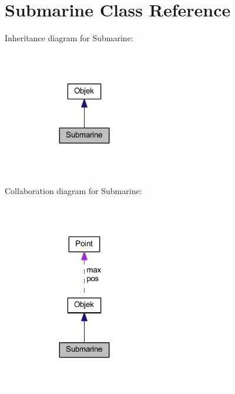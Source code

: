 \hypertarget{class_submarine}{}\section{Submarine Class Reference}
\label{class_submarine}


Inheritance diagram for Submarine\+:\nopagebreak
\begin{figure}[H]
\begin{center}
\leavevmode
\includegraphics[width=143pt]{class_submarine__inherit__graph}
\end{center}
\end{figure}


Collaboration diagram for Submarine\+:\nopagebreak
\begin{figure}[H]
\begin{center}
\leavevmode
\includegraphics[width=143pt]{class_submarine__coll__graph}
\end{center}
\end{figure}
